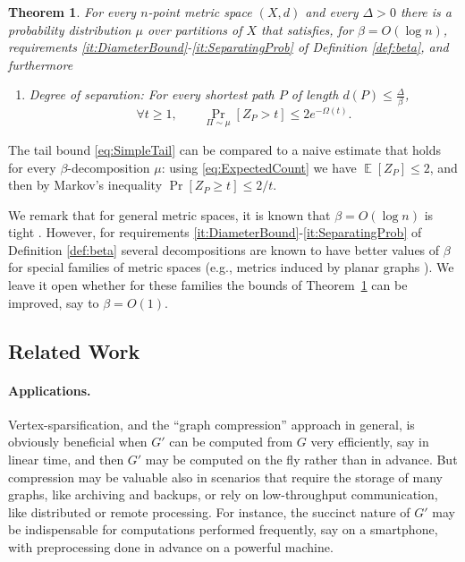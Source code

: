 \documentclass[twoside,leqno,twocolumn]{article}
\newtheorem{theorem}{Theorem}[section]
\DeclareMathOperator*{\EX}{{\mathbb E}}
\def\compactify{\itemsep=0pt \topsep=0pt \partopsep=0pt \parsep=0pt}
\begin{document}
\begin{theorem}\label{thm:main2}
For every $n$-point metric space $(X,d)$ and every $\Delta > 0$ 
there is a probability distribution $\mu$ over partitions of $X$
that satisfies, for $\beta = O(\log n)$,
requirements \ref{it:DiameterBound}-\ref{it:SeparatingProb} 
of Definition \ref{def:beta}, and furthermore
\begin{enumerate} \compactify
\renewcommand{\theenumi}{\emph{(\alph{enumi})}}
\addtocounter{enumi}{2}
\item \label{it:DegreeSeparation}
Degree of separation: For every shortest path $P$ of length $d(P)\leq \frac{\Delta}{\beta}$, 
\begin{equation}
  \label{eq:SimpleTail}
  \forall t \ge 1, \qquad 
  \Pr_{\Pi\sim\mu}\left[Z_P >  t \right] \le 2e^{- \Omega(t)}.
\end{equation}
\end{enumerate}
\end{theorem}
The tail bound \eqref{eq:SimpleTail} can be compared to a naive estimate 
that holds for every $\beta$-decomposition $\mu$:
using \eqref{eq:ExpectedCount} we have $\EX[Z_P]\le 2$,
and then by Markov's inequality $\Pr[Z_P \ge t] \le 2/t$.

We remark that for general metric spaces, it is known that $\beta = O(\log n)$ is tight \cite{Bartal96}. However, for requirements \ref{it:DiameterBound}-\ref{it:SeparatingProb} of Definition \ref{def:beta} several decompositions are known to have better values of $\beta$ 
for special families of metric spaces 
(e.g., metrics induced by planar graphs \cite{KPR93}). 
We leave it open whether for these families
the bounds of Theorem~\ref{thm:main2} can be improved, say to $\beta=O(1)$.


\subsection{Related Work} \label{sec:related}

\paragraph{Applications.}
Vertex-sparsification, and the ``graph compression'' approach in general, 
is obviously beneficial when $G'$ can be computed from $G$ very efficiently, 
say in linear time, 
and then $G'$ may be computed on the fly rather than in advance.
But compression may be valuable also in scenarios
that require the storage of many graphs, like archiving and backups,
or rely on low-throughput communication, like distributed or remote processing.
For instance, the succinct nature of $G'$ may be indispensable for computations
performed frequently, say on a smartphone,
with preprocessing done in advance on a powerful machine.
\end{document}
